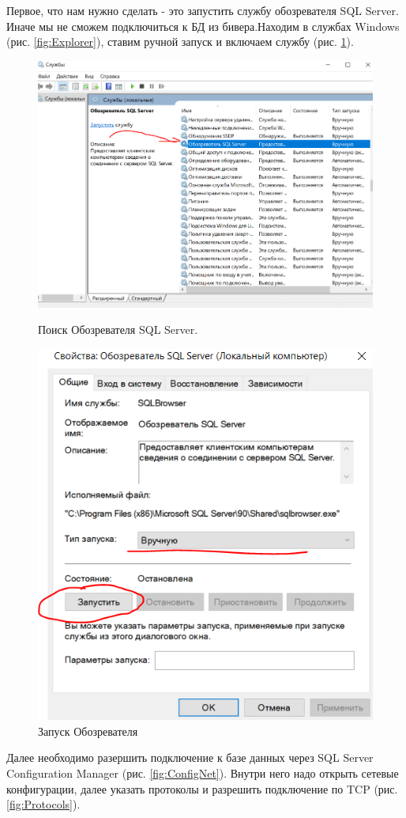 Первое, что нам нужно сделать - это запустить службу обозревателя SQL Server. Иначе мы не сможем подключиться к БД из бивера.Находим в службах Windows (рис. \ref{fig:Explorer}), ставим ручной запуск и включаем службу (рис. \ref{fig:ExplorerStart}).

\begin{figure}[h!]
    \begin{minipage}[p]{0.45\linewidth}
        \centering
        \includegraphics[width=1\linewidth]{Pic/lab2/Explorer.PNG}
        \caption{Поиск Обозревателя SQL Server.}
        \label{fig:Explorer}
    \end{minipage}
    \hfill
    \begin{minipage}[p]{0.45\linewidth}
        \centering
        \includegraphics[width=0.68\linewidth]{Pic/lab2/ExplorerStart.PNG}
        \caption{Запуск Обозревателя}
        \label{fig:ExplorerStart}
    \end{minipage}
    
\end{figure}
\newpage
Далее необходимо разершить подключение к базе данных через SQL Server Configuration Manager (рис. \ref{fig:ConfigNet}). Внутри него надо открыть сетевые конфигурации, далее указать протоколы и разрешить подключение по TCP (рис. \ref{fig:Protocols}).

